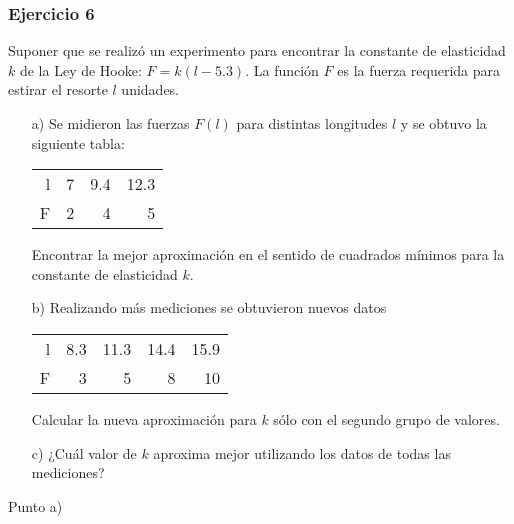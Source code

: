 \documentclass{article}
\begin{document}
\subsubsection{Ejercicio 6}
Suponer que se realizó un experimento para encontrar la constante de elasticidad $k$ de la Ley de Hooke: $F= k(l-5.3)$. La función $F$ es la fuerza requerida para estirar el resorte $l$ unidades.
\begin{itemize}
    \item[a) ] Se midieron las fuerzas $F(l)$ para distintas longitudes $l$ y se obtuvo la siguiente tabla:
    \begin{center}
        \begin{tabular}{||r||r|r|r||}
        \hline
        l & 7 & 9.4 & 12.3 \\
        F & 2 & 4 & 5 \\
        \hline
        \end{tabular}
    \end{center}
    Encontrar la mejor aproximación en el sentido de cuadrados mínimos para la constante de elasticidad $k$.
    \item[b) ] Realizando más mediciones se obtuvieron nuevos datos
    \begin{center}
        \begin{tabular}{||r||r|r|r|r||}
        \hline
        l & 8.3 & 11.3 & 14.4 & 15.9 \\
        F & 3 & 5 & 8 & 10 \\
        \hline
        \end{tabular}  
    \end{center}
    Calcular la nueva aproximación para $k$ sólo con el segundo grupo de valores.
    \item[c) ] ¿Cuál valor de $k$ aproxima mejor utilizando los datos de todas las mediciones?
\end{itemize}

\begin{center}
    Punto a) \\
\end{center}
\end{document}
